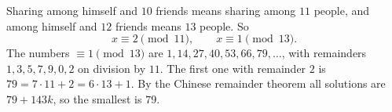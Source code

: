 Sharing among himself and $10$ friends means sharing among $11$ people, and among himself and $12$ friends means $13$ people. So
\[x\equiv2\pmod{11},\qquad x\equiv1\pmod{13}.\]
The numbers $\equiv1\pmod{13}$ are $1,14,27,40,53,66,79,\dots$, with remainders $1,3,5,7,9,0,2$ on division by $11$. The first one with remainder $2$ is $79=7\cdot11+2=6\cdot13+1$. By the Chinese remainder theorem all solutions are $79+143k$, so the smallest is $\boxed{79}$.
